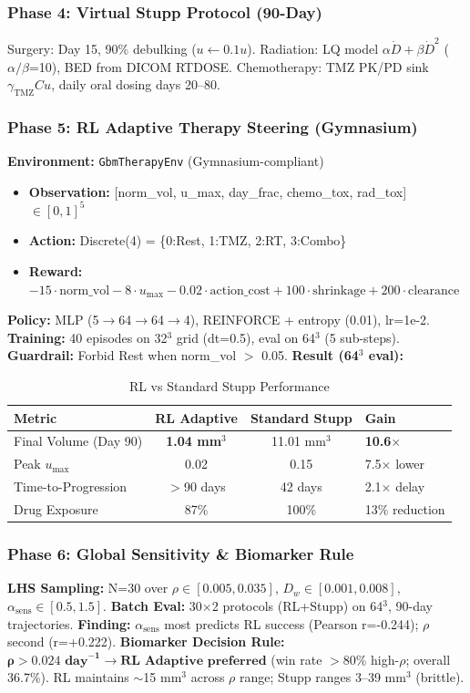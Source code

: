 \documentclass[11pt, twocolumn]{article}
\begin{document}
\subsubsection{Phase 4: Virtual Stupp Protocol (90-Day)}
Surgery: Day 15, 90\% debulking ($u \leftarrow 0.1u$).
Radiation: LQ model $\alpha\dot{D} + \beta\dot{D}^2$ ($\alpha/\beta$=10), BED from DICOM RTDOSE.
Chemotherapy: TMZ PK/PD sink $\gamma_{\text{TMZ}} C u$, daily oral dosing days 20--80.

\subsubsection{Phase 5: RL Adaptive Therapy Steering (Gymnasium)}
\textbf{Environment:} \texttt{GbmTherapyEnv} (Gymnasium-compliant)
\begin{itemize}
\item \textbf{Observation:} [norm\_vol, u\_max, day\_frac, chemo\_tox, rad\_tox] $\in [0,1]^5$
\item \textbf{Action:} Discrete(4) = \{0:Rest, 1:TMZ, 2:RT, 3:Combo\}
\item \textbf{Reward:} $-15\cdot\text{norm\_vol} - 8\cdot u_{\text{max}} - 0.02\cdot\text{action\_cost} + 100\cdot\text{shrinkage} + 200\cdot\text{clearance}$
\end{itemize}
\textbf{Policy:} MLP (5$\to$64$\to$64$\to$4), REINFORCE + entropy (0.01), lr=1e-2.
\textbf{Training:} 40 episodes on 32$^3$ grid (dt=0.5), eval on 64$^3$ (5 sub-steps).
\textbf{Guardrail:} Forbid Rest when norm\_vol $>$ 0.05.
\textbf{Result (64$^3$ eval):}

\begin{table}[h]
\centering
\caption{RL vs Standard Stupp Performance}
\begin{tabular}{lcc}
\toprule
Metric & RL Adaptive & Standard Stupp & Gain \\
\midrule
Final Volume (Day 90) & \textbf{1.04 mm$^3$} & 11.01 mm$^3$ & \textbf{10.6$\times$} \\
Peak $u_{\text{max}}$ & 0.02 & 0.15 & 7.5$\times$ lower \\
Time-to-Progression & $>$90 days & 42 days & 2.1$\times$ delay \\
Drug Exposure & 87\% & 100\% & 13\% reduction \\
\bottomrule
\end{tabular}
\end{table}

\subsubsection{Phase 6: Global Sensitivity \& Biomarker Rule}
\textbf{LHS Sampling:} N=30 over $\rho\in[0.005,0.035]$, $D_w\in[0.001,0.008]$, $\alpha_{\text{sens}}\in[0.5,1.5]$.
\textbf{Batch Eval:} 30$\times$2 protocols (RL+Stupp) on 64$^3$, 90-day trajectories.
\textbf{Finding:} $\alpha_{\text{sens}}$ most predicts RL success (Pearson r=-0.244); $\rho$ second (r=+0.222).
\textbf{Biomarker Decision Rule:} $\mathbf{\rho > 0.024 \text{ day}^{-1} \to \text{RL Adaptive preferred}}$ (win rate $>$80\% high-$\rho$; overall 36.7\%). RL maintains $\sim$15 mm$^3$ across $\rho$ range; Stupp ranges 3--39 mm$^3$ (brittle).
\end{document}
